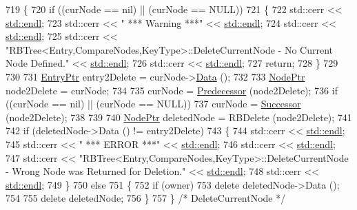 \begin{DoxyCode}
719 \{
720   \textcolor{keywordflow}{if}  ((curNode == nil)   ||  (curNode == NULL))
721   \{
722     std::cerr << \hyperlink{namespace_k_k_b_ad1f50f65af6adc8fa9e6f62d007818a8}{std::endl};
723     std::cerr << \textcolor{stringliteral}{"    *** Warning ***"}  << \hyperlink{namespace_k_k_b_ad1f50f65af6adc8fa9e6f62d007818a8}{std::endl};
724     std::cerr << \hyperlink{namespace_k_k_b_ad1f50f65af6adc8fa9e6f62d007818a8}{std::endl};
725     std::cerr << \textcolor{stringliteral}{"RBTree<Entry,CompareNodes,KeyType>::DeleteCurrentNode -  No Current Node Defined."} << 
      \hyperlink{namespace_k_k_b_ad1f50f65af6adc8fa9e6f62d007818a8}{std::endl};
726     std::cerr << \hyperlink{namespace_k_k_b_ad1f50f65af6adc8fa9e6f62d007818a8}{std::endl};
727     \textcolor{keywordflow}{return};
728   \}
729 
730 
731   \hyperlink{class_k_k_b_1_1_r_b_tree_a0e7710d8357973338c99b99034b17f33}{EntryPtr}  entry2Delete = curNode->\hyperlink{class_k_k_b_1_1_r_bnode_a9d29b22149e67b0a1949dbf7e2f2c91b}{Data} ();
732 
733   \hyperlink{class_k_k_b_1_1_r_b_tree_a6b0f3cc33c4554c51afe9bbb82c41906}{NodePtr}  node2Delete = curNode;
734 
735   curNode = \hyperlink{class_k_k_b_1_1_r_b_tree_a3a5c20c3087b62c7a68a48878eb8fe82}{Predecessor} (node2Delete);
736   \textcolor{keywordflow}{if}  ((curNode == nil)  ||  (curNode == NULL))
737     curNode = \hyperlink{class_k_k_b_1_1_r_b_tree_ab1d21c68ef6c6a58b0317f9986e66804}{Successor} (node2Delete);
738 
739 
740   \hyperlink{class_k_k_b_1_1_r_b_tree_a6b0f3cc33c4554c51afe9bbb82c41906}{NodePtr}  deletedNode = RBDelete (node2Delete);
741 
742   \textcolor{keywordflow}{if}  (deletedNode->Data () != entry2Delete)
743   \{
744     std::cerr << \hyperlink{namespace_k_k_b_ad1f50f65af6adc8fa9e6f62d007818a8}{std::endl};
745     std::cerr << \textcolor{stringliteral}{"    *** ERROR ***"}  << \hyperlink{namespace_k_k_b_ad1f50f65af6adc8fa9e6f62d007818a8}{std::endl};
746     std::cerr << \hyperlink{namespace_k_k_b_ad1f50f65af6adc8fa9e6f62d007818a8}{std::endl};
747     std::cerr << \textcolor{stringliteral}{"RBTree<Entry,CompareNodes,KeyType>::DeleteCurrentNode -  Wrong Node was Returned for
       Deletion."} << \hyperlink{namespace_k_k_b_ad1f50f65af6adc8fa9e6f62d007818a8}{std::endl};
748     std::cerr << \hyperlink{namespace_k_k_b_ad1f50f65af6adc8fa9e6f62d007818a8}{std::endl};
749   \}
750   \textcolor{keywordflow}{else}
751   \{
752     \textcolor{keywordflow}{if}  (owner)
753       \textcolor{keyword}{delete}  deletedNode->Data ();
754 
755     \textcolor{keyword}{delete}  deletedNode;
756   \}
757 \}  \textcolor{comment}{/* DeleteCurrentNode */}
\end{DoxyCode}
